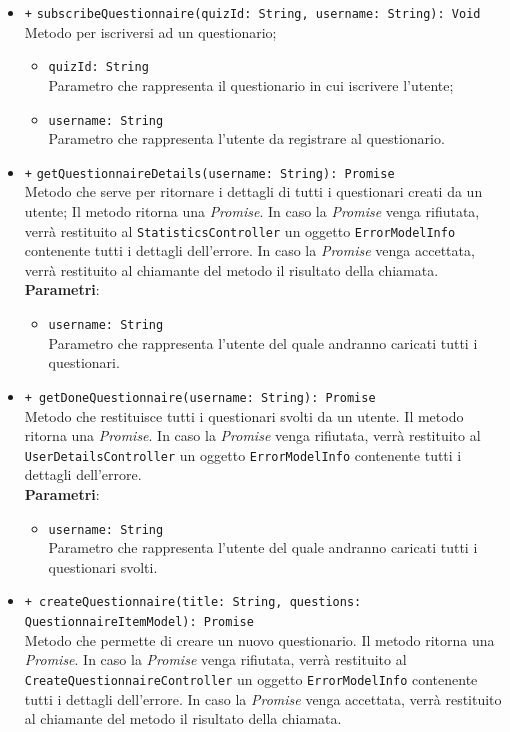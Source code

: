 \begin{itemize}
\begin{itemize}
\begin{itemize}
	\end{itemize}
	\item \texttt{+} \texttt{subscribeQuestionnaire(quizId: String, username: String): Void} \\Metodo per iscriversi ad un questionario;
	\begin{itemize}
		\item \texttt{quizId: String} \\ Parametro che rappresenta il questionario in cui iscrivere l'utente;
		\item \texttt{username: String} \\ Parametro che rappresenta l'utente da registrare al questionario.
	\end{itemize}
	\item \texttt{+} \texttt{getQuestionnaireDetails(username: String): Promise} \\Metodo che serve per ritornare i dettagli di tutti i questionari creati da un utente; Il metodo ritorna una \textit{Promise}. In caso la \textit{Promise} venga rifiutata, verrà restituito al \texttt{StatisticsController} un oggetto \texttt{ErrorModelInfo} contenente tutti i dettagli dell'errore. In caso la \textit{Promise} venga accettata, verrà restituito al chiamante del metodo il risultato della chiamata.\\ 
     \textbf{Parametri}:
	\begin{itemize}
		\item \texttt{username: String} \\ Parametro che rappresenta l'utente del quale andranno caricati tutti i questionari.
	\end{itemize}
	\item \texttt{+ getDoneQuestionnaire(username: String): Promise} \\ Metodo che restituisce tutti i questionari svolti da un utente. Il metodo ritorna una \textit{Promise}. In caso la \textit{Promise} venga rifiutata, verrà restituito al \texttt{UserDetailsController} un oggetto \texttt{ErrorModelInfo} contenente tutti i dettagli dell'errore. \\
	\textbf{Parametri}: 
	\begin{itemize}
		\item \texttt{username: String} \\ Parametro che rappresenta l'utente del quale andranno caricati tutti i questionari svolti.
	\end{itemize}
	\item \texttt{+ createQuestionnaire(title: String, questions: QuestionnaireItemModel): Promise} \\ Metodo che permette di creare un nuovo questionario. Il metodo ritorna una \textit{Promise}. In caso la \textit{Promise} venga rifiutata, verrà restituito al \texttt{CreateQuestionnaireController} un oggetto \texttt{ErrorModelInfo} contenente tutti i dettagli dell'errore. In caso la \textit{Promise} venga accettata, verrà restituito al chiamante del metodo il risultato della chiamata.\\

\end{itemize}
\end{itemize}
